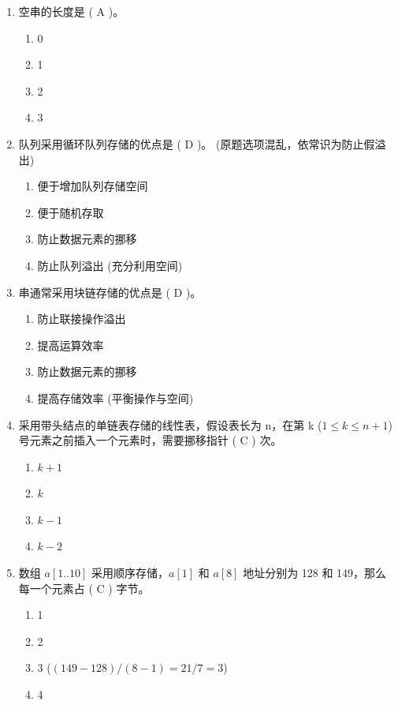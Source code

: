 \documentclass[12pt, a4paper]{article}
\begin{document}
\begin{enumerate}[label=\arabic*.]
    \item 空串的长度是 ( A )。
    \begin{enumerate}
        \item 0
        \item 1
        \item 2
        \item 3
    \end{enumerate}

    \item 队列采用循环队列存储的优点是 ( D )。 (原题选项混乱，依常识为防止假溢出)
    \begin{enumerate}
        \item 便于增加队列存储空间
        \item 便于随机存取
        \item 防止数据元素的挪移
        \item 防止队列溢出 (充分利用空间)
    \end{enumerate}

    \item 串通常采用块链存储的优点是 ( D )。
    \begin{enumerate}
        \item 防止联接操作溢出
        \item 提高运算效率
        \item 防止数据元素的挪移
        \item 提高存储效率 (平衡操作与空间)
    \end{enumerate}

    \item 采用带头结点的单链表存储的线性表，假设表长为 n，在第 k ($1 \le k \le n+1$) 号元素之前插入一个元素时，需要挪移指针 ( C ) 次。
    \begin{enumerate}
        \item $k+1$
        \item $k$
        \item $k-1$
        \item $k-2$
    \end{enumerate}

    \item 数组 $a[1..10]$ 采用顺序存储，$a[1]$ 和 $a[8]$ 地址分别为 128 和 149，那么每一个元素占 ( C ) 字节。
    \begin{enumerate}
        \item 1
        \item 2
        \item 3 ($(149-128)/(8-1) = 21/7 = 3$)
        \item 4
    \end{enumerate}


\end{enumerate}
\end{document}
